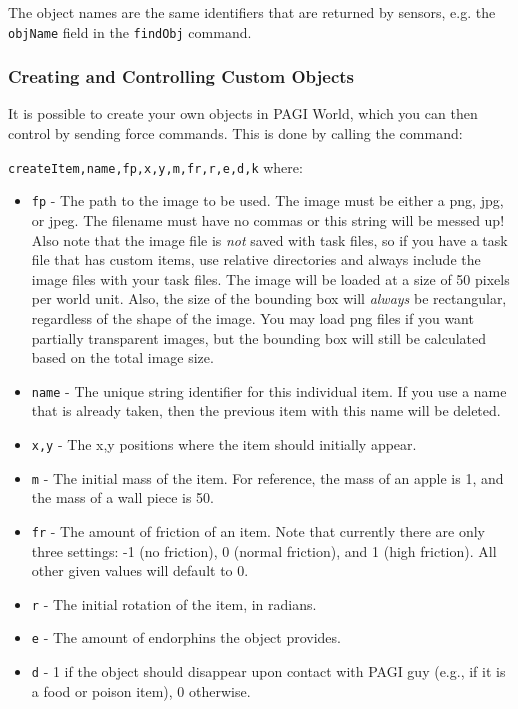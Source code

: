 The object names are the same identifiers that are returned by sensors, e.g. the \texttt{objName} field in the \texttt{findObj} command.

\subsubsection{Creating and Controlling Custom Objects}

It is possible to create your own objects in PAGI World, which you can then control by sending force commands. This is done by calling the command:

\texttt{createItem,name,fp,x,y,m,fr,r,e,d,k} where:

\begin{itemize}
\item \texttt{fp} - The path to the image to be used. The image must be either a png, jpg, or jpeg. The filename must have no commas or this string will be messed up! Also note that the image file is \textit{not} saved with task files, so if you have a task file that has custom items, use relative directories and always include the image files with your task files. The image will be loaded at a size of 50 pixels per world unit. Also, the size of the bounding box will \textit{always} be rectangular, regardless of the shape of the image. You may load png files if you want partially transparent images, but the bounding box will still be calculated based on the total image size.
\item \texttt{name} - The unique string identifier for this individual item. If you use a name that is already taken, then the previous item with this name will be deleted.
\item \texttt{x,y} - The x,y positions where the item should initially appear.
\item \texttt{m} - The initial mass of the item. For reference, the mass of an apple is 1, and the mass of a wall piece is 50.
\item \texttt{fr} - The amount of friction of an item. Note that currently there are only three settings: -1 (no friction), 0 (normal friction), and 1 (high friction). All other given values will default to 0.
\item \texttt{r} - The initial rotation of the item, in radians. 
\item \texttt{e} - The amount of endorphins the object provides.
\item \texttt{d} - 1 if the object should disappear upon contact with PAGI guy (e.g., if it is a food or poison item), 0 otherwise.

\end{itemize}
